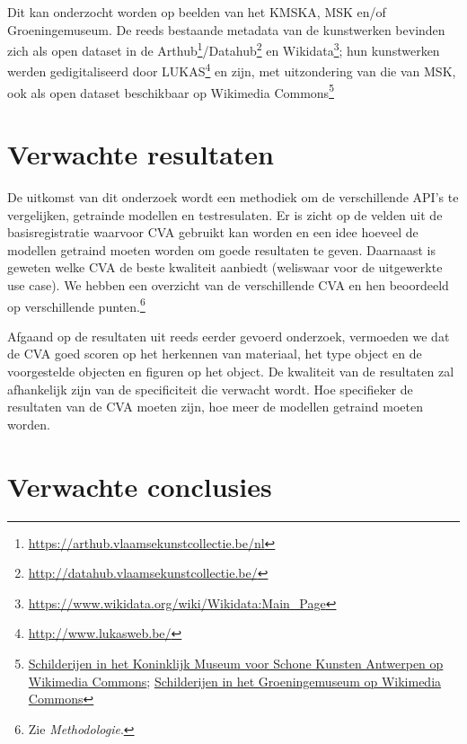 \documentclass[fleqn,10pt]{voorstel}
\begin{document}
Dit kan onderzocht worden op beelden van het KMSKA, MSK en/of Groeningemuseum. De reeds bestaande metadata van de kunstwerken bevinden zich als open dataset in de Arthub\footnote{\url{https://arthub.vlaamsekunstcollectie.be/nl}}/Datahub\footnote{\url{http://datahub.vlaamsekunstcollectie.be/}} en Wikidata\footnote{\url{https://www.wikidata.org/wiki/Wikidata:Main_Page}}; hun kunstwerken werden gedigitaliseerd door LUKAS\footnote{\url{http://www.lukasweb.be/}} en zijn, met uitzondering van die van MSK, ook als open dataset beschikbaar op Wikimedia Commons\footnote{\href{https://commons.wikimedia.org/wiki/Paintings_in_the_Royal_Museum_of_Fine_Arts_Antwerp}{Schilderijen in het Koninklijk Museum voor Schone Kunsten Antwerpen op Wikimedia Commons}; \href{https://commons.wikimedia.org/wiki/Paintings_in_the_Groeningemuseum}{Schilderijen in het Groeningemuseum op Wikimedia Commons}}

\section{Verwachte resultaten}
\label{sec:verwachte_resultaten}

De uitkomst van dit onderzoek wordt een methodiek om de verschillende API's te vergelijken, getrainde modellen en testresulaten. Er is zicht op de velden uit de basisregistratie waarvoor CVA gebruikt kan worden en een idee hoeveel de modellen getraind moeten worden om goede resultaten te geven. Daarnaast is geweten welke CVA de beste kwaliteit aanbiedt (weliswaar voor de uitgewerkte use case). We hebben een overzicht van de verschillende CVA en hen beoordeeld op verschillende punten.\footnote{Zie \emph{Methodologie}.} 

Afgaand op de resultaten uit reeds eerder gevoerd onderzoek, vermoeden we dat de CVA goed scoren op het herkennen van materiaal, het type object en de voorgestelde objecten en figuren op het object. De kwaliteit van de resultaten zal afhankelijk zijn van de specificiteit die verwacht wordt. Hoe specifieker de resultaten van de CVA moeten zijn, hoe meer de modellen getraind moeten worden.

\section{Verwachte conclusies}
\label{sec:verwachte_conclusies}
\end{document}
